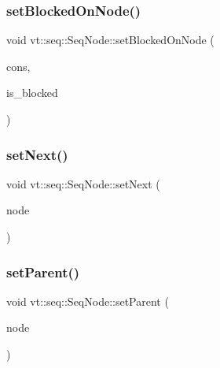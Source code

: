 \mbox{\label{structvt_1_1seq_1_1_seq_node_a9ae8d493bc9466e50ed56c40ce627f38}} 
\subsubsection{\texorpdfstring{set\+Blocked\+On\+Node()}{setBlockedOnNode()}}
{\footnotesize\ttfamily void vt\+::seq\+::\+Seq\+Node\+::set\+Blocked\+On\+Node (\begin{DoxyParamCaption}\item[{\hyperlink{namespacevt_1_1seq_a3041a01a5db2bccb3183e73b49e78252}{e\+Seq\+Construct\+Type}}]{cons,  }\item[{bool const \&}]{is\+\_\+blocked }\end{DoxyParamCaption})}

\mbox{\label{structvt_1_1seq_1_1_seq_node_afd77c05a6301d91d1ac3dab9c84d2561}} 
\subsubsection{\texorpdfstring{set\+Next()}{setNext()}}
{\footnotesize\ttfamily void vt\+::seq\+::\+Seq\+Node\+::set\+Next (\begin{DoxyParamCaption}\item[{\hyperlink{namespacevt_1_1seq_ae6a4874b585be0612aaca32ca6d2d191}{Seq\+Node\+Ptr\+Type}}]{node }\end{DoxyParamCaption})}

\mbox{\label{structvt_1_1seq_1_1_seq_node_ae475f4a6a842766eb22bdd3204b35719}} 
\subsubsection{\texorpdfstring{set\+Parent()}{setParent()}}
{\footnotesize\ttfamily void vt\+::seq\+::\+Seq\+Node\+::set\+Parent (\begin{DoxyParamCaption}\item[{\hyperlink{namespacevt_1_1seq_ae6a4874b585be0612aaca32ca6d2d191}{Seq\+Node\+Ptr\+Type}}]{node }\end{DoxyParamCaption})}


